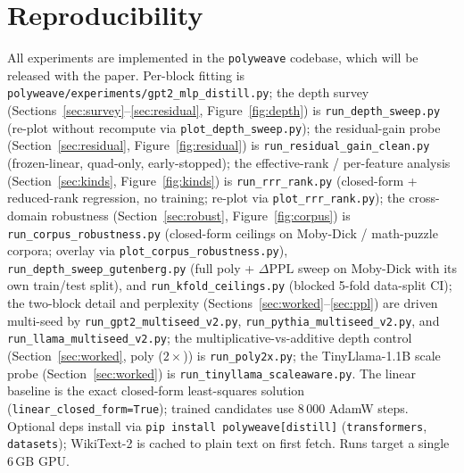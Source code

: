 \documentclass{article}
\newcommand{\dppl}{\Delta\mathrm{PPL}}
\begin{document}
\section{Reproducibility}
\label{sec:repro}

All experiments are implemented in the \texttt{polyweave} codebase, which will be released with the paper. Per-block fitting is
\texttt{polyweave/experiments/gpt2\_mlp\_distill.py}; the depth survey
(Sections~\ref{sec:survey}--\ref{sec:residual}, Figure~\ref{fig:depth}) is
\texttt{run\_depth\_sweep.py} (re-plot without recompute via \texttt{plot\_depth\_sweep.py}); the
residual-gain probe (Section~\ref{sec:residual}, Figure~\ref{fig:residual}) is
\texttt{run\_residual\_gain\_clean.py} (frozen-linear, quad-only, early-stopped); the effective-rank /
per-feature analysis (Section~\ref{sec:kinds}, Figure~\ref{fig:kinds}) is \texttt{run\_rrr\_rank.py}
(closed-form + reduced-rank regression, no training; re-plot via \texttt{plot\_rrr\_rank.py}); the
cross-domain robustness (Section~\ref{sec:robust}, Figure~\ref{fig:corpus}) is
\texttt{run\_corpus\_robustness.py} (closed-form ceilings on Moby-Dick / math-puzzle corpora; overlay
via \texttt{plot\_corpus\_robustness.py}), \texttt{run\_depth\_sweep\_gutenberg.py} (full poly +
$\dppl$ sweep on Moby-Dick with its own train/test split), and \texttt{run\_kfold\_ceilings.py}
(blocked 5-fold data-split CI); the two-block detail and perplexity
(Sections~\ref{sec:worked}--\ref{sec:ppl}) are driven multi-seed by
\texttt{run\_gpt2\_multiseed\_v2.py}, \texttt{run\_pythia\_multiseed\_v2.py}, and
\texttt{run\_llama\_multiseed\_v2.py}; the multiplicative-vs-additive depth control
(Section~\ref{sec:worked}, poly ($2\times$)) is \texttt{run\_poly2x.py}; the TinyLlama-1.1B scale
probe (Section~\ref{sec:worked}) is \texttt{run\_tinyllama\_scaleaware.py}. The linear baseline is the
exact closed-form least-squares solution (\texttt{linear\_closed\_form=True}); trained candidates use
8\,000 AdamW steps. Optional deps install via \texttt{pip install polyweave[distill]}
(\texttt{transformers}, \texttt{datasets}); WikiText-2 is cached to plain text on first fetch. Runs
target a single 6\,GB GPU.



\end{document}
